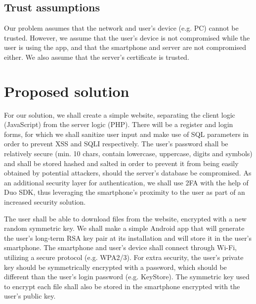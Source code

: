 \documentclass[12pt]{article}
\begin{document}

\newpage

\subsection{Trust assumptions}

Our problem assumes that the network and user's device (e.g. PC) cannot be trusted. However, we assume that the user's device is not compromised while the user is using the app, and that the smartphone and server are not compromised either. We also assume that the server's certificate is trusted.

\section{Proposed solution}

For our solution, we shall create a simple website, separating the client logic (JavaScript) from the server logic (PHP). There will be a register and login forms, for which we shall sanitize user input and make use of SQL parameters in order to prevent XSS and SQLI respectively. The user's password shall be relatively secure (min. 10 chars, contain lowercase, uppercase, digits and symbols) and shall be stored hashed and salted in order to prevent it from being easily obtained by potential attackers, should the server's database be compromised. As an additional security layer for authentication, we shall use 2FA with the help of Duo SDK, thus leveraging the smartphone's proximity to the user as part of an increased security solution.\par

The user shall be able to download files from the website, encrypted with a new random symmetric key. We shall make a simple Android app that will generate the user's long-term RSA key pair at its installation and will store it in the user's smartphone. The smartphone and user's device shall connect through Wi-Fi, utilizing a secure protocol (e.g. WPA2/3). For extra security, the user's private key should be symmetrically encrypted with a password, which should be different than the user's login password (e.g. KeyStore). The symmetric key used to encrypt each file shall also be stored in the smartphone encrypted with the user's public key.\par
\end{document}
